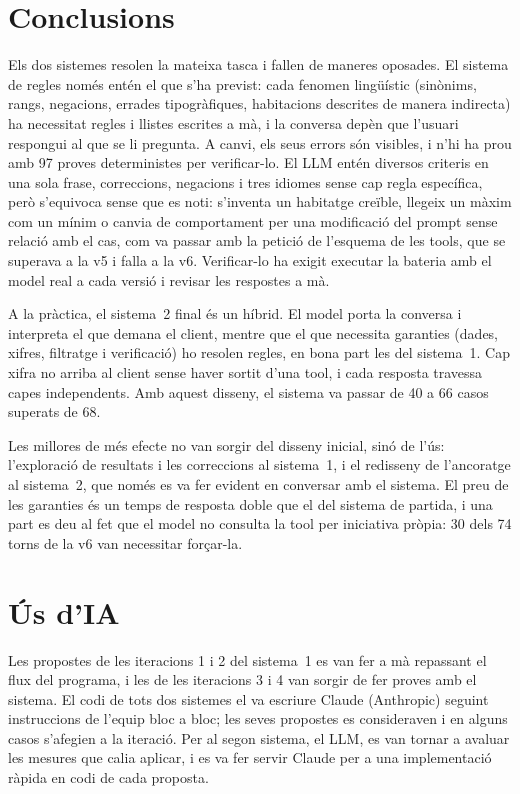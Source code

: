 \documentclass[10pt,a4paper]{article}
\begin{document}
\section{Conclusions}

Els dos sistemes resolen la mateixa tasca i fallen de maneres oposades. El sistema de regles només entén el que s'ha previst: cada fenomen lingüístic (sinònims, rangs, negacions, errades tipogràfiques, habitacions descrites de manera indirecta) ha necessitat regles i llistes escrites a mà, i la conversa depèn que l'usuari respongui al que se li pregunta. A canvi, els seus errors són visibles, i n'hi ha prou amb 97 proves deterministes per verificar-lo. El LLM entén diversos criteris en una sola frase, correccions, negacions i tres idiomes sense cap regla específica, però s'equivoca sense que es noti: s'inventa un habitatge creïble, llegeix un màxim com un mínim o canvia de comportament per una modificació del prompt sense relació amb el cas, com va passar amb la petició de l'esquema de les tools, que se superava a la v5 i falla a la v6. Verificar-lo ha exigit executar la bateria amb el model real a cada versió i revisar les respostes a mà.

A la pràctica, el sistema~2 final és un híbrid. El model porta la conversa i interpreta el que demana el client, mentre que el que necessita garanties (dades, xifres, filtratge i verificació) ho resolen regles, en bona part les del sistema~1. Cap xifra no arriba al client sense haver sortit d'una tool, i cada resposta travessa capes independents. Amb aquest disseny, el sistema va passar de 40 a 66 casos superats de 68.

Les millores de més efecte no van sorgir del disseny inicial, sinó de l'ús: l'exploració de resultats i les correccions al sistema~1, i el redisseny de l'ancoratge al sistema~2, que només es va fer evident en conversar amb el sistema. El preu de les garanties és un temps de resposta doble que el del sistema de partida, i una part es deu al fet que el model no consulta la tool per iniciativa pròpia: 30 dels 74 torns de la v6 van necessitar forçar-la.

\section{Ús d'IA}

Les propostes de les iteracions 1 i 2 del sistema~1 es van fer a mà repassant el flux del programa, i les de les iteracions 3 i 4 van sorgir de fer proves amb el sistema. El codi de tots dos sistemes el va escriure Claude (Anthropic) seguint instruccions de l'equip bloc a bloc; les seves propostes es consideraven i en alguns casos s'afegien a la iteració. Per al segon sistema, el LLM, es van tornar a avaluar les mesures que calia aplicar, i es va fer servir Claude per a una implementació ràpida en codi de cada proposta.
\end{document}
